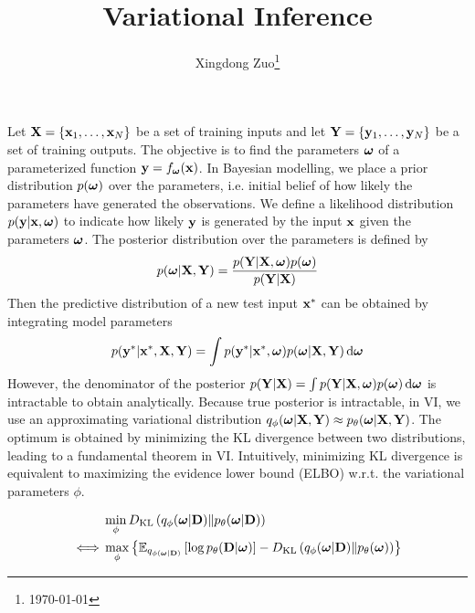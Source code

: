 \documentclass{article}
\title{Variational Inference}
\author{
    Xingdong Zuo\thanks{\today} \\
}
\begin{document}
\maketitle

Let $\bfX = \set{\bfx_1, \dots, \bfx_N}$ be a set of training inputs and let $\bfY = \set{\bfy_1, \dots, \bfy_N}$ be a set of training outputs. The objective is to find the parameters $\bfomega$ of a parameterized function $\bfy = f_{\bfomega}(\bfx)$. In Bayesian modelling, we place a prior distribution $p(\bfomega)$ over the parameters, i.e. initial belief of how likely the parameters have generated the observations. We define a likelihood distribution $p(\bfy|\bfx, \bfomega)$ to indicate how likely $\bfy$ is generated by the input $\bfx$ given the parameters $\bfomega$. The posterior distribution over the parameters is defined by
\begin{equation*}
    p(\bfomega|\bfX, \bfY) = \frac{p(\bfY|\bfX, \bfomega)p(\bfomega)}{p(\bfY|\bfX)}
\end{equation*}
Then the predictive distribution of a new test input $\bfx^*$ can be obtained by integrating model parameters
\begin{equation*}
    p(\bfy^*|\bfx^*, \bfX, \bfY) = \int p(\bfy^*|\bfx^*, \bfomega)p(\bfomega|\bfX, \bfY) \dd\bfomega
\end{equation*}
However, the denominator of the posterior $p(\bfY|\bfX) = \int p(\bfY|\bfX, \bfomega)p(\bfomega) \dd\bfomega$ is intractable to obtain analytically. Because true posterior is intractable, in VI, we use an approximating variational distribution $q_\phi(\bfomega|\bfX, \bfY)\approx p_\theta(\bfomega|\bfX, \bfY)$. The optimum is obtained by minimizing the KL divergence between two distributions, leading to a fundamental theorem in VI. Intuitively, minimizing KL divergence is equivalent to maximizing the evidence lower bound (ELBO) w.r.t. the variational parameters $\phi$. 
\begin{theorem}
    \begin{align*}
        &\min_{\phi} \KL{q_{\phi}(\bfomega|\bfD)}{p_{\theta}(\bfomega|\bfD)} \\
        \iff
        &\max_{\phi} \left\{ \Exp{\log p_{\theta}(\bfD|\bfomega)}{q_{\phi(\bfomega|\bfD)}}-\KL{q_{\phi}(\bfomega|\bfD)}{p_{\theta}(\bfomega)} \right\}
    \end{align*}
\end{theorem}
\end{document}
